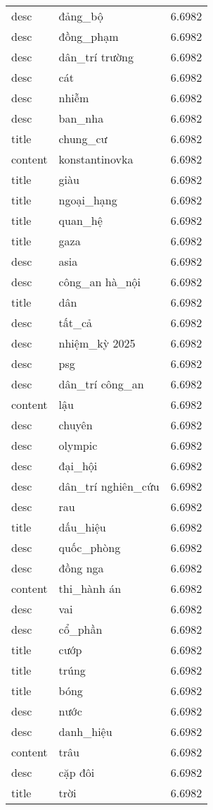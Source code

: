 \documentclass{article}
\begin{document}
\begin{tabular}{lll}
desc & đảng\_bộ & 6.6982\\
desc & đồng\_phạm & 6.6982\\
desc & dân\_trí trường & 6.6982\\
desc & cát & 6.6982\\
desc & nhiễm & 6.6982\\
desc & ban\_nha & 6.6982\\
title & chung\_cư & 6.6982\\
content & konstantinovka & 6.6982\\
title & giàu & 6.6982\\
title & ngoại\_hạng & 6.6982\\
title & quan\_hệ & 6.6982\\
title & gaza & 6.6982\\
desc & asia & 6.6982\\
desc & công\_an hà\_nội & 6.6982\\
title & dân & 6.6982\\
desc & tất\_cả & 6.6982\\
desc & nhiệm\_kỳ 2025 & 6.6982\\
desc & psg & 6.6982\\
desc & dân\_trí công\_an & 6.6982\\
content & lậu & 6.6982\\
desc & chuyên & 6.6982\\
desc & olympic & 6.6982\\
desc & đại\_hội & 6.6982\\
desc & dân\_trí nghiên\_cứu & 6.6982\\
desc & rau & 6.6982\\
title & dấu\_hiệu & 6.6982\\
desc & quốc\_phòng & 6.6982\\
desc & đồng nga & 6.6982\\
content & thi\_hành án & 6.6982\\
desc & vai & 6.6982\\
desc & cổ\_phần & 6.6982\\
title & cướp & 6.6982\\
title & trúng & 6.6982\\
title & bóng & 6.6982\\
desc & nước & 6.6982\\
desc & danh\_hiệu & 6.6982\\
content & trâu & 6.6982\\
desc & cặp đôi & 6.6982\\
title & trời & 6.6982\\

\end{tabular}
\end{document}
